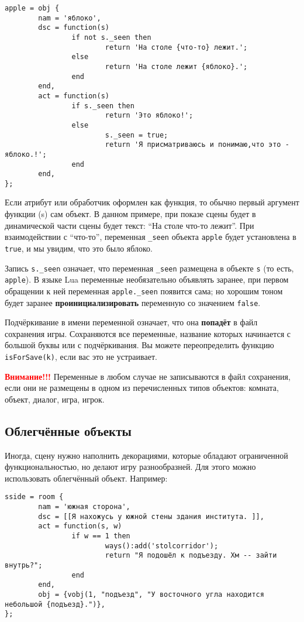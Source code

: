 \documentclass[a4paper,12pt]{article}
\begin{document}
\begin{verbatim}
apple = obj {
        nam = 'яблоко',
        dsc = function(s)
                if not s._seen then
                        return 'На столе {что-то} лежит.';
                else
                        return 'На столе лежит {яблоко}.';
                end
        end,
        act = function(s)
                if s._seen then
                        return 'Это яблоко!';
                else
                        s._seen = true;
                        return 'Я присматриваюсь и понимаю,что это - яблоко.!';
                end
        end,
};
\end{verbatim}

Если атрибут или обработчик оформлен как функция, то обычно первый аргумент функции (s) сам объект. В данном примере, при показе сцены будет в динамической части сцены будет текст: ``На столе что-то лежит''. При взаимодействии с ``что-то'', переменная \verb/_seen/ объекта \verb/apple/ будет установлена в \verb/true/, и мы увидим, что это было яблоко.

Запись \verb/s._seen/ означает, что переменная \verb/_seen/ размещена в объекте \verb/s/ (то есть, \verb/apple/). В языке Lua переменные необязательно объявлять заранее, при первом обращении к ней переменная \verb/apple._seen/ появится сама; но хорошим тоном будет заранее \textbf{проинициализировать} переменную со значением \verb/false/.

Подчёркивание в имени переменной означает, что она \textbf{попадёт} в файл сохранения игры. Сохраняются все переменные, название которых начинается с большой буквы или с подчёркивания. Вы можете переопределить функцию \verb/isForSave(k)/, если вас это не устраивает.

\textbf{\textcolor{red}{Внимание!!!}} Переменные в любом случае не записываются в файл сохранения, если они не размещены в одном из перечисленных типов объектов: комната, объект, диалог, игра, игрок.

\subsection{Облегчённые объекты}

Иногда, сцену нужно наполнить декорациями, которые обладают ограниченной функциональностью, но делают игру разнообразней. Для этого можно использовать облегчённый объект. Например:

\begin{verbatim}
sside = room {
        nam = 'южная сторона',
        dsc = [[Я нахожусь у южной стены здания института. ]],
        act = function(s, w)
                if w == 1 then
                        ways():add('stolcorridor');
                        return "Я подошёл к подъезду. Хм -- зайти внутрь?";
                end
        end,
        obj = {vobj(1, "подъезд", "У восточного угла находится небольшой {подъезд}.")},
};
\end{verbatim}
\end{document}
